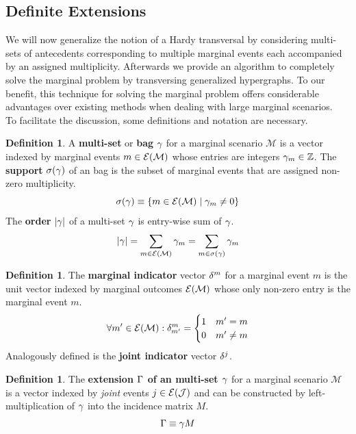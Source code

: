 \documentclass[aps, 10pt, english, twoside, pra, nofootinbib, longbibliography]{revtex4-1}
\theoremstyle{plain}
\theoremstyle{definition}
\newtheorem{definition}[theorem]{Definition}
\theoremstyle{remark}
\newcommand{\mscenario}{\mathcal{M}}
\newcommand{\jointvar}{\mathcal{J}}
\newcommand{\supp}[1]{\si\br{#1}}
\newcommand{\term}[1]{\textcolor{Mahogany}{\textbf{#1}}}
\newcommand{\tcdot}{} %
\newcommand{\Events}[1]{\s{E}\br{#1}} %
\begin{document}
    \subsection{Definite Extensions}
    We will now generalize the notion of a Hardy transversal by considering multi-sets of antecedents corresponding to multiple marginal events each accompanied by an assigned multiplicity. Afterwards we provide an algorithm to completely solve the marginal problem by transversing generalized hypergraphs. To our benefit, this technique for solving the marginal problem offers considerable advantages over existing methods when dealing with large marginal scenarios. \\

    To facilitate the discussion, some definitions and notation are necessary.
    \begin{definition}
        A \term{multi-set} or \term{bag} $\gamma$ for a marginal scenario $\mscenario$ is a vector indexed by marginal events $m \in \Events{\mscenario}$ whose entries are integers $\gamma_{m} \in {\mathbb{Z}}$. The \term{support} $\supp{\ga}$ of an bag is the subset of marginal events that are assigned non-zero multiplicity.
        \[ \supp{\ga} \defined \bc{m \in \Events{\mscenario} \mid \ga_m \neq 0} \]
        The \term{order} $\abs{\ga}$ of a multi-set $\gamma$ is entry-wise sum of $\gamma$.
        \[ \abs{\ga} = \sum_{m \in \Events{\mscenario}} \ga_m = \sum_{m \in \supp{\ga}} \ga_m \]
    \end{definition}

    \begin{definition}
        The \term{marginal indicator} vector $\delta^{m}$ for a marginal event $m$ is the unit vector indexed by marginal outcomes $\Events{\mscenario}$ whose only non-zero entry is the marginal event $m$.
        \[ \forall m' \in \Events{\mscenario} : \de^{m}_{m'} = \begin{cases}
            1 & m' = m \\
            0 & m' \neq m
        \end{cases} \]
        Analogously defined is the \term{joint indicator} vector $\delta^{j}$.
    \end{definition}

    \begin{definition}
        The \term{extension $\Gamma$ of an multi-set $\gamma$} for a marginal scenario $\mscenario$ is a vector indexed by \textit{joint} events $j \in \Events{\jointvar}$ and can be constructed by left-multiplication of $\gamma$ into the incidence matrix $M$.
        \[ \Ga \defined \ga \tcdot M \]
    \end{definition}
\end{document}

